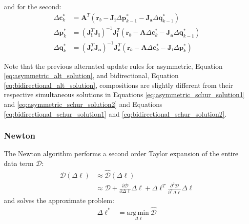and for the second:
\begin{equation}
    \begin{aligned}
        \Delta\mathbf{c}^*_k & = \mathbf{A}^T \left( \mathbf{r}_b - \mathbf{J}_{\mathbf{i}} \Delta\mathbf{p}^*_{k-1} - \mathbf{J}_{\mathbf{a}} \Delta\mathbf{q}^*_{k-1} \right) 
        \\
        \Delta\mathbf{p}^*_k & = (\mathbf{J}_{\mathbf{i}}^T\mathbf{J}_{\mathbf{i}})^{-1} \mathbf{J}_{\mathbf{i}}^T \left( \mathbf{r}_b - \mathbf{A} \Delta\mathbf{c}^*_{k} - \mathbf{J}_{\mathbf{a}} \Delta\mathbf{q}^*_{k-1} \right)
        \\
        \Delta\mathbf{q}^*_k & = (\mathbf{J}_{\mathbf{a}}^T\mathbf{J}_{\mathbf{a}})^{-1} \mathbf{J}_{\mathbf{a}}^T \left( \mathbf{r}_b - \mathbf{A} \Delta\mathbf{c}^*_{k} - \mathbf{J}_{\mathbf{i}} \Delta\mathbf{p}^*_{k} \right)
        \label{eq:bidirectional_alt_solution}
    \end{aligned}
\end{equation}

Note that the previous alternated update rules for asymmetric, Equation \ref{eq:asymmetric_alt_solution}, and bidirectional, Equation \ref{eq:bidirectional_alt_solution}, compositions are slightly different from their respective simultaneous solutions in Equations \ref{eq:asymmetric_schur_solution1} and \ref{eq:asymmetric_schur_solution2} and Equations \ref{eq:bidirectional_schur_solution1} and \ref{eq:bidirectional_schur_solution2}.

\subsubsection{Newton}
\label{sec:newton}

The Newton algorithm performs a second order Taylor expansion of the entire data term $\mathcal{D}$:
\begin{equation}
    \begin{aligned}
		\mathcal{D}(\Delta \boldsymbol{\ell}) & \approx \hat{\mathcal{D}}(\Delta \boldsymbol{\ell})
		\\
		& \approx \mathcal{D} + \frac{\partial \mathcal{D}}{\partial \Delta \boldsymbol{\ell}} \Delta \boldsymbol{\ell} + \Delta \boldsymbol{\ell}^T \frac{\partial^2 \mathcal{D}}{\partial^2 \Delta \boldsymbol{\ell}} \Delta \boldsymbol{\ell}
    \label{eq:newton_taylor}
    \end{aligned}
\end{equation}
and solves the approximate problem:
\begin{equation}
    \begin{aligned}
        \Delta \boldsymbol{\ell}^* & = \underset{\Delta \boldsymbol{\ell}}{\mathrm{arg\,min\;}} \hat{\mathcal{D}}
    \label{eq:newton_optimization_problem}
    \end{aligned}
\end{equation}

